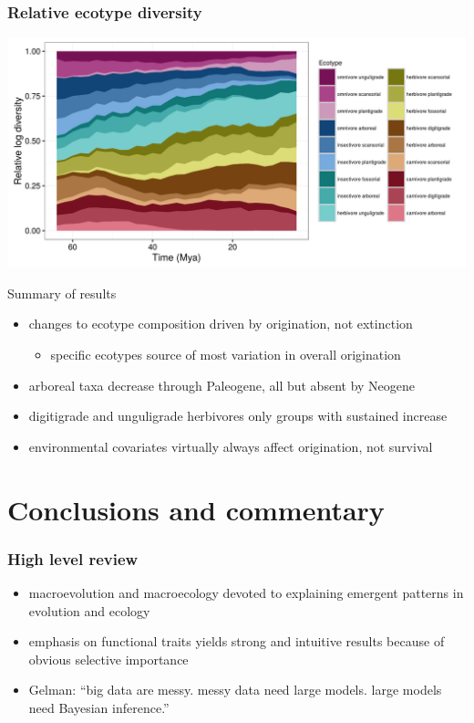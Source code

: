 \documentclass{beamer}
\begin{document}
\begin{frame}
  \frametitle{Relative ecotype diversity}
  \begin{center}
    \includegraphics[height=0.8\textheight,width=\textwidth,keepaspectratio=true]{figure/relative_diversity}
  \end{center}
\end{frame}

\begin{frame}
  \begin{block}{Summary of results}
    \begin{itemize}
      \item changes to ecotype composition driven by origination, not extinction
        \begin{itemize}
          \item specific ecotypes source of most variation in overall origination
        \end{itemize}
      \item arboreal taxa decrease through Paleogene, all but absent by Neogene
      \item digitigrade and unguligrade herbivores only groups with sustained increase
      \item environmental covariates virtually always affect origination, not survival
    \end{itemize}
  \end{block}
\end{frame}


\endgroup


\section{Conclusions and commentary}
\begin{frame}
  \frametitle{High level review}
  \begin{itemize}
    \item<1-> macroevolution and macroecology devoted to explaining emergent patterns in evolution and ecology
    \item<2-> emphasis on functional traits yields strong and intuitive results because of obvious selective importance
    \item<3-> Gelman: ``big data are messy. messy data need large models. large models need Bayesian inference.''
  \end{itemize}
\end{frame}
\end{document}
